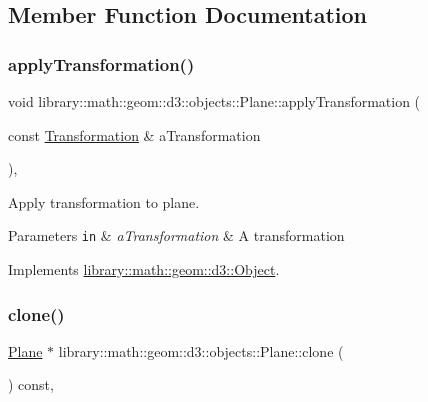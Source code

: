 \subsection{Member Function Documentation}
\mbox{\label{classlibrary_1_1math_1_1geom_1_1d3_1_1objects_1_1_plane_ab3474aef2e9f8dd4f9e86da017522487}} 
\subsubsection{\texorpdfstring{apply\+Transformation()}{applyTransformation()}}
{\footnotesize\ttfamily void library\+::math\+::geom\+::d3\+::objects\+::\+Plane\+::apply\+Transformation (\begin{DoxyParamCaption}\item[{const \hyperlink{classlibrary_1_1math_1_1geom_1_1d3_1_1_transformation}{Transformation} \&}]{a\+Transformation }\end{DoxyParamCaption})\hspace{0.3cm}{\ttfamily [override]}, {\ttfamily [virtual]}}



Apply transformation to plane. 


\begin{DoxyParams}[1]{Parameters}
\mbox{\tt in}  & {\em a\+Transformation} & A transformation \\
\hline
\end{DoxyParams}


Implements \hyperlink{classlibrary_1_1math_1_1geom_1_1d3_1_1_object_a5fc47b1ee5d9a28efc6010d3d1512470}{library\+::math\+::geom\+::d3\+::\+Object}.

\mbox{\label{classlibrary_1_1math_1_1geom_1_1d3_1_1objects_1_1_plane_a0b6a4ae7bef06f3995f8fd9d32a88870}} 
\subsubsection{\texorpdfstring{clone()}{clone()}}
{\footnotesize\ttfamily \hyperlink{classlibrary_1_1math_1_1geom_1_1d3_1_1objects_1_1_plane}{Plane} $\ast$ library\+::math\+::geom\+::d3\+::objects\+::\+Plane\+::clone (\begin{DoxyParamCaption}{ }\end{DoxyParamCaption}) const\hspace{0.3cm}{\ttfamily [override]}, {\ttfamily [virtual]}}



